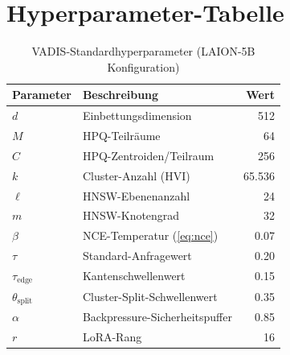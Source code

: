 ﻿\documentclass[12pt,a4paper]{article}
\begin{document}
\section{Hyperparameter-Tabelle}
\label{app:hyperparams}

\begin{table}[ht]
\centering
\small
\caption{VADIS-Standardhyperparameter (LAION-5B Konfiguration)}
\label{tab:hyperparams}
\begin{tabular}{@{}llr@{}}
\toprule
\textbf{Parameter} & \textbf{Beschreibung} & \textbf{Wert} \\
\midrule
$d$ & Einbettungsdimension & 512 \\
$M$ & HPQ-Teilräume & 64 \\
$C$ & HPQ-Zentroiden/Teilraum & 256 \\
$k$ & Cluster-Anzahl (HVI) & 65.536 \\
$\ell$ & HNSW-Ebenenanzahl & 24 \\
$m$ & HNSW-Knotengrad & 32 \\
$\beta$ & NCE-Temperatur (\cref{eq:nce}) & 0.07 \\
$\tau$ & Standard-Anfragewert & 0.20 \\
$\tau_{\text{edge}}$ & Kantenschwellenwert & 0.15 \\
$\theta_{\text{split}}$ & Cluster-Split-Schwellenwert & 0.35 \\
$\alpha$ & Backpressure-Sicherheitspuffer & 0.85 \\
$r$ & LoRA-Rang & 16 \\
\bottomrule
\end{tabular}
\end{table}
\end{document}
